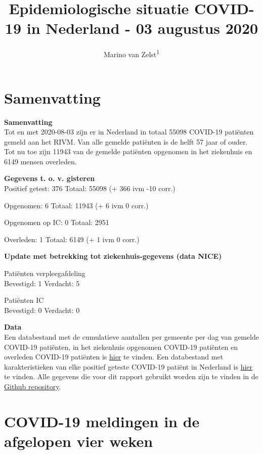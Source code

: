 \documentclass[
  english,
  man,floatsintext]{apa6}
\title{Epidemiologische situatie COVID-19 in Nederland - 03 augustus 2020}
\author{Marino van Zelst\textsuperscript{1}}
\date{}
\affiliation{\vspace{0.5cm}\textsuperscript{1} -}
\begin{document}
\maketitle

{
\hypersetup{linkcolor=}
\setcounter{tocdepth}{3}
\tableofcontents
}
\newpage

\hypertarget{samenvatting}{%
\section{Samenvatting}\label{samenvatting}}

\textbf{Samenvatting}\\
Tot en met 2020-08-03 zijn er in Nederland in totaal 55098 COVID-19 patiënten gemeld aan het RIVM. Van alle gemelde patiënten is de helft 57 jaar of ouder. Tot nu toe zijn 11943 van de gemelde patiënten opgenomen in het ziekenhuis en 6149 mensen overleden.

\textbf{Gegevens t. o. v. gisteren}\\
Positief getest: 376
Totaal: 55098 (+ 366 ivm -10 corr.)

Opgenomen: 6
Totaal: 11943 (+
6 ivm 0 corr.)

Opgenomen op IC: 0
Totaal: 2951

Overleden: 1
Totaal: 6149 (+
1 ivm 0 corr.)

\textbf{Update met betrekking tot ziekenhuis-gegevens (data NICE)}

Patiënten verpleegafdeling\\
Bevestigd: 1 Verdacht: 5

Patiënten IC\\
Bevestigd: 0 Verdacht: 0

\textbf{Data}\\
Een databestand met de cumulatieve aantallen per gemeente per dag van gemelde COVID-19 patiënten, in het ziekenhuis opgenomen COVID-19 patiënten en overleden COVID-19 patiënten is \href{https://data.rivm.nl/geonetwork/srv/dut/catalog.search\#/metadata/1c0fcd57-1102-4620-9cfa-441e93ea5604}{hier} te vinden. Een databestand met karakteristieken van elke positief geteste COVID-19 patiënt in Nederland is \href{https://data.rivm.nl/geonetwork/srv/dut/catalog.search\#/metadata/2c4357c8-76e4-4662-9574-1deb8a73f724?tab=relations}{hier} te vinden. Alle gegevens die voor dit rapport gebruikt worden zijn te vinden in de \href{https://github.com/mzelst/covid-19}{Github repository}.

\newpage

\hypertarget{covid-19-meldingen-in-de-afgelopen-vier-weken}{%
\section{COVID-19 meldingen in de afgelopen vier weken}\label{covid-19-meldingen-in-de-afgelopen-vier-weken}}
\end{document}
